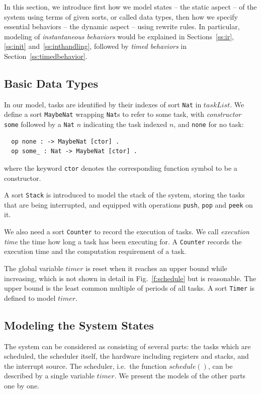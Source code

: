 \documentclass[12pt,onecolumn]{IEEEtranTIE}
\begin{document}
In this section, we introduce first how we model states -- the static
aspect -- of the system using terms of given sorts, or called data
types, then how we specify essential behaviors -- the dynamic aspect
-- using rewrite rules. In particular, modeling of \emph{instantaneous
  behaviors} would be explained in Sections~\ref{ss:ir}, \ref{ss:init}
and~\ref{ss:inthandling}, followed by \emph{timed behaviors} in
Section~\ref{ss:timedbehavior}.

\subsection{Basic Data Types}
In our model, tasks are identified by their indexes of sort \verb|Nat|
in $\mathit{taskList}$. We define a sort \verb|MaybeNat| wrapping
\verb|Nat|s to refer to some task, with \emph{constructor} \verb|some|
followed by a \verb|Nat| $n$ indicating the task indexed $n$, and
\verb|none| for no task:
\begin{verbatim}
  op none : -> MaybeNat [ctor] .
  op some_ : Nat -> MaybeNat [ctor] .
\end{verbatim}
where the keyword \verb|ctor| denotes the corresponding function
symbol to be a constructor.

A sort \verb|Stack| is introduced to model the stack of the system,
storing the tasks that are being interrupted, and equipped with
operations \verb|push|, \verb|pop| and \verb|peek| on it.

We also need a sort \verb|Counter| to record the execution of tasks.
We call \emph{execution time} the time how long a task has been
executing for. A \verb|Counter| records the execution time and the
computation requirement of a task.

The global variable $\mathit{timer}$ is reset when it reaches an upper
bound while increasing, which is not shown in detail in
Fig.~\ref{f:schedule} but is reasonable. The upper bound is the least
common multiple of periods of all tasks. A sort \verb|Timer| is
defined to model $\mathit{timer}$.

\subsection{Modeling the System States}
The system can be considered as consisting of several parts: the tasks
which are scheduled, the scheduler itself, the hardware including
registers and stacks, and the interrupt source. The scheduler,
i.e.\ the function $\mathit{schedule()}$, can be described by a single
variable $\mathit{timer}$. We present the models of the other parts
one by one.
\end{document}
